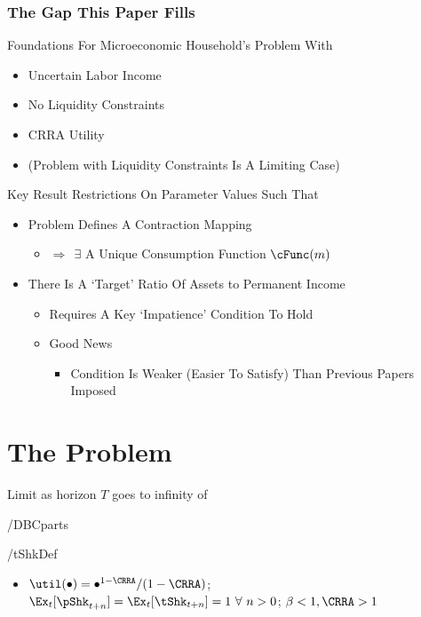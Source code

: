 \documentclass[pdflatex]{beamer}\providecommand{\texname}{BufferStockTheorySlides}%
\begin{document}
\begin{frame}
\frametitle{The Gap This Paper Fills}

\pause Foundations For Microeconomic Household's Problem With
\begin{itemize}
\item Uncertain Labor Income
\item No Liquidity Constraints
\item CRRA Utility
\item (Problem with Liquidity Constraints Is A Limiting Case)
\end{itemize}

\end{frame}
\begin{frame}{Key Result}
\pause
Restrictions On Parameter Values Such That \pause
\begin{itemize}
\item Problem Defines A Contraction Mapping
\begin{itemize}
\item $\Rightarrow~~\exists $ A Unique Consumption Function $\cFunc(m)$
\end{itemize}
\item There Is A `Target' Ratio Of Assets to Permanent Income
\begin{itemize}
\item Requires A Key `Impatience' Condition To Hold
\item Good News
\begin{itemize} \item Condition Is Weaker (Easier To Satisfy) Than Previous Papers Imposed \end{itemize}
\end{itemize}
\end{itemize}

\end{frame}

\section{The Problem}

\begin{frame}

Limit as horizon $T$ goes to infinity of 

 \EqDir/DBCparts

 \EqDir/tShkDef

\begin{itemize}
\item $\util(\bullet)=\bullet^{1-\CRRA}/(1-\CRRA)$; $\Ex_{t}[\pShk_{t+n}]=\Ex_{t}[\tShk_{t+n}]=1~\forall~n>0$; $\beta < 1, \CRRA > 1$
\end{itemize}

\end{frame}
\end{document}

